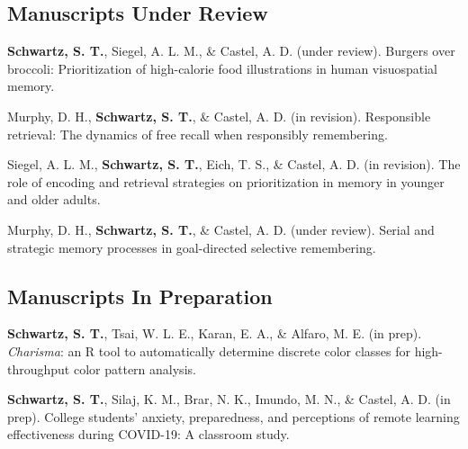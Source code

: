 \subsection*{Manuscripts Under Review}
\textbf{Schwartz, S. T.}, Siegel, A. L. M., \& Castel, A. D. (under review). Burgers over broccoli: Prioritization of high-calorie food illustrations in human visuospatial memory.

\pubspace

Murphy, D. H., \textbf{Schwartz, S. T.}, \& Castel, A. D. (in revision). Responsible retrieval: The dynamics of free recall when responsibly remembering.

\pubspace

Siegel, A. L. M., \textbf{Schwartz, S. T.}, Eich, T. S., \& Castel, A. D. (in revision). The role of encoding and retrieval strategies on prioritization in memory in younger and older adults.

\pubspace

Murphy, D. H., \textbf{Schwartz, S. T.}, \& Castel, A. D. (under review). Serial and strategic memory processes in goal-directed selective remembering.

\subsection*{Manuscripts In Preparation}
\textbf{Schwartz, S. T.}, Tsai, W. L. E., Karan, E. A., \& Alfaro, M. E. (in prep). \textit{Charisma}: an R tool to automatically determine discrete color classes for high-throughput color pattern analysis.

\pubspace

\textbf{Schwartz, S. T.}, Silaj, K. M., Brar, N. K., Imundo, M. N., \& Castel, A. D. (in prep). College students’ anxiety, preparedness, and perceptions of remote learning effectiveness during COVID-19: A classroom study.




